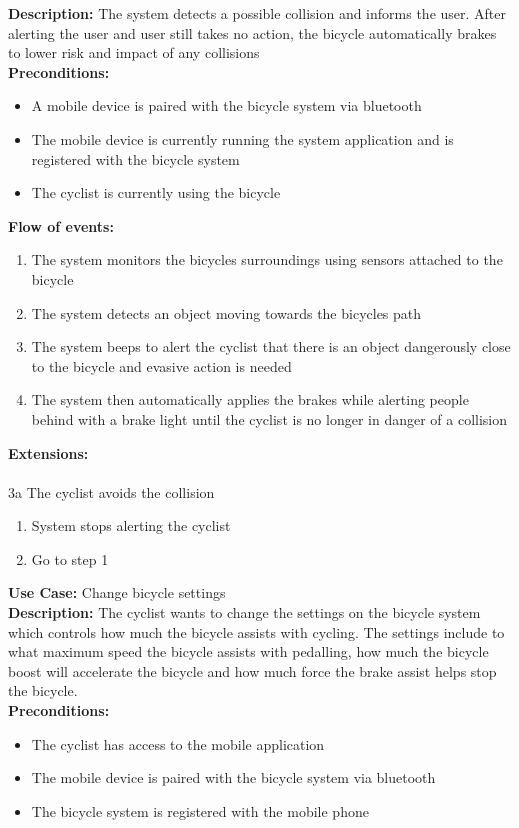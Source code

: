 \documentclass[a4paper]{report}
\begin{document}
\textbf{Description:} The system detects a possible collision and informs the user. After alerting the user and user still takes no action, the bicycle automatically brakes to lower risk and impact of any collisions\\
\textbf{Preconditions:} \begin{itemize}
\item A mobile device is paired with the bicycle system via bluetooth
\item The mobile device is currently running the system application and is registered with the bicycle system
\item The cyclist is currently using the bicycle
\end{itemize}
\textbf{Flow of events:} \begin{enumerate}
\item The system monitors the bicycles surroundings using sensors attached to the bicycle
\item The system detects an object moving towards the bicycles path
\item The system beeps to alert the cyclist that there is an object dangerously close to the bicycle and evasive action is needed
\item The system then automatically applies the brakes while alerting people behind with a brake light until the cyclist is no longer in danger of a collision
\end{enumerate}
\textbf{Extensions:} \\\\
3a The cyclist avoids the collision
\begin{enumerate}
\item System stops alerting the cyclist
\item Go to step 1
\end{enumerate}
\textbf{Use Case:} Change bicycle settings\\
\textbf{Description:} The cyclist wants to change the settings on the bicycle system which controls how much the bicycle assists with cycling. The settings include to what maximum speed the bicycle assists with pedalling, how much the bicycle boost will accelerate the bicycle and how much force the brake assist helps stop the bicycle. \\
\textbf{Preconditions:} \begin{itemize}
\item The cyclist has access to the mobile application
\item The mobile device is paired with the bicycle system via bluetooth
\item The bicycle system is registered with the mobile phone
\end{itemize}
\end{document}
